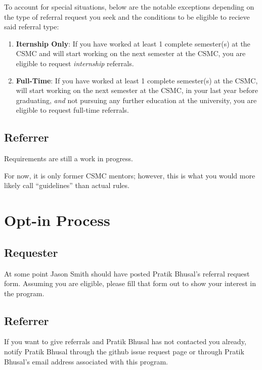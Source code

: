 \documentclass[letterpaper, 12pt]{article}
\newcommand{\minCompleteInternshipRequirementSemesters}{1}
\newcommand{\currentBoss}{Jason Smith}
\begin{document}
To account for special situations, below are the notable exceptions depending on
the type of referral request you seek and the conditions to be eligible to
recieve said referral type:

\begin{enumerate}
    \item \textbf{Iternship Only}: If you have worked at least
        \minCompleteInternshipRequirementSemesters{} complete semester(s) at the
        CSMC and will start working on the next semester at the CSMC, you are
        eligible to request \textit{internship} referrals.
    \item \textbf{Full-Time}: If you have worked at least
        \minCompleteInternshipRequirementSemesters{} complete semester(s) at the
        CSMC, will start working on the next semester at the CSMC, in your last
        year before graduating, \textit{and} not pursuing any further education
        at the university, you are eligible to request full-time referrals.
\end{enumerate}

\subsection{Referrer}

Requirements are still a work in progress.

For now, it is only former CSMC mentors; however, this is what you would more
likely call ``guidelines'' than actual rules.

\section{Opt-in Process}

\subsection{Requester}

At some point \currentBoss{} should have posted Pratik Bhusal's referral request
form. Assuming you are eligible, please fill that form out to show your interest
in the program.

\subsection{Referrer}

If you want to give referrals and Pratik Bhusal has not contacted you already,
notify Pratik Bhusal through the github issue request page or through Pratik
Bhusal's email address associated with this program.
\end{document}
